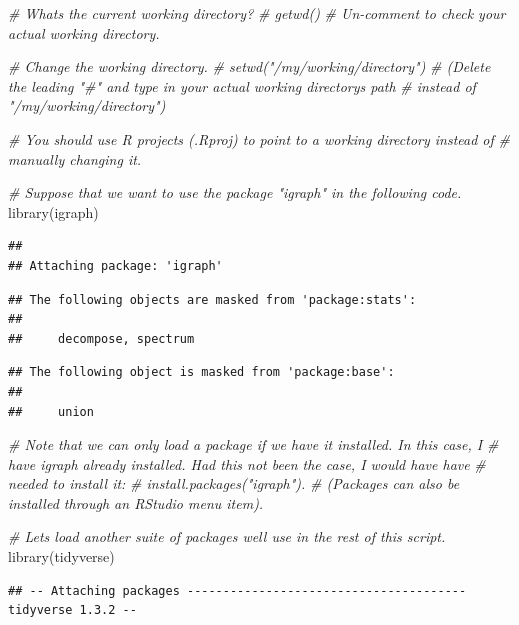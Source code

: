\documentclass[
]{book}
\newenvironment{Shaded}{\begin{snugshade}}{\end{snugshade}}
\newcommand{\CommentTok}[1]{\textcolor[rgb]{0.56,0.35,0.01}{\textit{#1}}}
\newcommand{\FunctionTok}[1]{\textcolor[rgb]{0.00,0.00,0.00}{#1}}
\newcommand{\NormalTok}[1]{#1}
\begin{document}
\begin{Shaded}
\begin{Highlighting}[]
\CommentTok{\# What\textquotesingle{}s the current working directory? }
\CommentTok{\# getwd() }
\CommentTok{\# Un{-}comment to check your actual working directory.}

\CommentTok{\# Change the working directory. }
\CommentTok{\# setwd("/my/working/directory") }
\CommentTok{\# (Delete the leading "\#" and type in your actual working directory\textquotesingle{}s path}
\CommentTok{\# instead of "/my/working/directory")}

\CommentTok{\# You should use R projects (.Rproj) to point to a working directory instead of}
\CommentTok{\# manually changing it.}

\CommentTok{\# Suppose that we want to use the package "igraph" in the following code.}
\FunctionTok{library}\NormalTok{(igraph)}
\end{Highlighting}
\end{Shaded}

\begin{verbatim}
## 
## Attaching package: 'igraph'
\end{verbatim}

\begin{verbatim}
## The following objects are masked from 'package:stats':
## 
##     decompose, spectrum
\end{verbatim}

\begin{verbatim}
## The following object is masked from 'package:base':
## 
##     union
\end{verbatim}

\begin{Shaded}
\begin{Highlighting}[]
\CommentTok{\# Note that we can only load a package if we have it installed. In this case, I}
\CommentTok{\# have igraph already installed. Had this not been the case, I would have have}
\CommentTok{\# needed to install it: }
\CommentTok{\# install.packages("igraph").}
\CommentTok{\# (Packages can also be installed through an RStudio menu item).}

\CommentTok{\# Let\textquotesingle{}s load another suite of packages we\textquotesingle{}ll use in the rest of this script.}
\FunctionTok{library}\NormalTok{(tidyverse)}
\end{Highlighting}
\end{Shaded}

\begin{verbatim}
## -- Attaching packages --------------------------------------- tidyverse 1.3.2 --
\end{verbatim}
\end{document}

